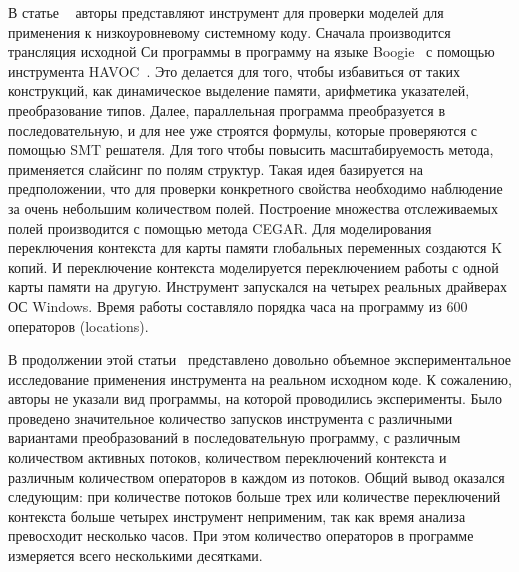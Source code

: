 В статье ~\cite{Lahiri:2009} авторы представляют инструмент для проверки моделей для применения к низкоуровневому системному коду.
Сначала производится трансляция исходной Си программы в программу на языке Boogie~\cite{boogiePL} с помощью инструмента HAVOC~\cite{Chatterjee:2007}.
Это делается для того, чтобы избавиться от таких конструкций, как динамическое выделение памяти, арифметика указателей, преобразование типов. Далее, параллельная программа преобразуется в последовательную, и для нее уже строятся формулы, которые проверяются с помощью SMT решателя.
Для того чтобы повысить масштабируемость метода, применяется слайсинг по полям структур.
Такая идея базируется на предположении, что для проверки конкретного свойства необходимо наблюдение за очень небольшим количеством полей.
Построение множества отслеживаемых полей производится с помощью метода CEGAR. 
Для моделирования переключения контекста для карты памяти глобальных переменных создаются K копий. И переключение контекста моделируется переключением работы с одной карты памяти на другую.
Инструмент запускался на четырех реальных драйверах ОС Windows.
Время работы составляло порядка часа на программу из 600 операторов (locations). 

В продолжении этой статьи~\cite{Ghafari:2010} представлено довольно объемное экспериментальное исследование применения инструмента на реальном исходном коде.
К сожалению, авторы не указали вид программы, на которой проводились эксперименты.
Было проведено значительное количество запусков инструмента с различными вариантами преобразований в последовательную программу, с различным количеством активных потоков, количеством переключений контекста и различным количеством операторов в каждом из потоков.
Общий вывод оказался следующим: при количестве потоков больше трех или количестве переключений контекста больше четырех инструмент неприменим, так как время анализа превосходит несколько часов.
При этом количество операторов в программе измеряется всего несколькими десятками.

